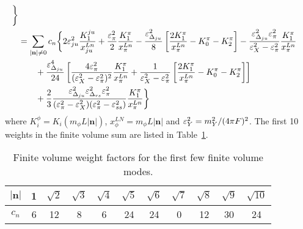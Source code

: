 \documentclass[prd,11pt,tightenlines,preprintnumbers,showpacs,superscriptaddress,notitlepage,nofootinbib,eqsecnum,floatfix,longbibliography]{revtex4-1}
\begin{document}
\begin{align}
	\bigg\}
\nonumber\\&= \sum_{|\mathbf{n}|\neq0} c_n \bigg\{
	2{\varepsilon}_{ju}^2\frac{K_1^{ju}}{x^{Ln}_{ju}}
	+\frac{{\varepsilon}_{\pi}^2}{2}\frac{K_1^\pi}{x^{Ln}_{\pi}}
	-\frac{{\varepsilon}_{{\Delta}_{ju}}^2}{8} \left[
		\frac{2K_1^\pi}{x^{Ln}_{\pi}}
		-K_0^\pi
		-K_2^\pi
	\right]
	-\frac{{\varepsilon}_{{\Delta}_{ju}}^2 {\varepsilon}_\pi^2}{{\varepsilon}_X^2-{\varepsilon}_\pi^2} \frac{K_1^\pi}{x^{Ln}_{\pi}}
\nonumber\\&\qquad 
	+\frac{{\varepsilon}_{{\Delta}_{ju}}^4}{24} \left[
	\frac{4{\varepsilon}_\pi^2}{({\varepsilon}_X^2-{\varepsilon}_\pi^2)^2} \frac{K_1^\pi}{x^{Ln}_{\pi}}
	+\frac{1}{{\varepsilon}_X^2 -{\varepsilon}_\pi^2} \left[
		\frac{2K_1^\pi}{x^{Ln}_{\pi}}
		-K_0^\pi
		-K_2^\pi
	\right]
	\right]
\nonumber\\&\qquad 
	+\frac{2}{3}\frac{{\varepsilon}_{{\Delta}_{ju}}^2{\varepsilon}_{{\Delta}_{rs}}^2 {\varepsilon}_\pi^2}{({\varepsilon}_\pi^2-{\varepsilon}_X^2)({\varepsilon}_\pi^2-{\varepsilon}_{ss}^2)}
	 \frac{K_1^\pi}{x^{Ln}_{\pi}}
	\bigg\}
\end{align}
where $K_i^\phi = K_i(m_\phi L |\mathbf{n}|)$, $x^{LN}_\phi = m_\phi L |\mathbf{n}|$ and ${\varepsilon}_Y^2 = m_Y^2 / (4\pi F)^2$.
The first 10 weights in the finite volume sum are listed in Table~\ref{tab:cn_weigths}.


\begin{table}
\begin{ruledtabular}
\begin{tabular}{c|cccccccccc}
$|\mathbf{n}|$& 1 & $\sqrt{2}$& $\sqrt{3}$& $\sqrt{4}$& $\sqrt{5}$& $\sqrt{6}$& $\sqrt{7}$& $\sqrt{8}$& $\sqrt{9}$& $\sqrt{10}$\\
\hline
$c_n$& 6&12& 8& 6& 24& 24& 0& 12& 30& 24
\end{tabular}
\end{ruledtabular}
\caption{\label{tab:cn_weigths}
Finite volume weight factors for the first few finite volume modes.
}
\end{table}








\end{document}
